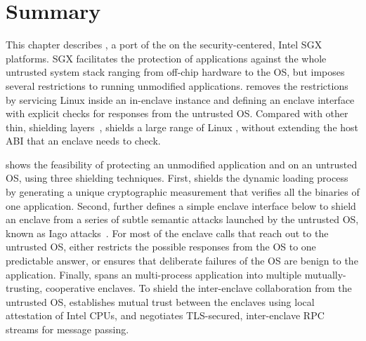 \section{Summary}

This chapter describes \graphenesgx{},
a port of the \graphene{} \libos{} on the security-centered, Intel SGX platforms.
SGX facilitates the protection of applications
against the whole untrusted system stack ranging from off-chip hardware to the OS,
but imposes several restrictions to running unmodified applications.
\graphenesgx{} removes the restrictions
by servicing Linux \linuxapis{} inside an in-enclave \libos{} instance and defining an enclave interface with explicit checks for responses from the untrusted OS.
Compared with other thin, shielding layers~\cite{osdi16scone,shinde17panoply}, \graphenesgx{} shields a large range of Linux \linuxapis{},
without extending the host ABI that an enclave needs to check.



\graphenesgx{} shows the feasibility
of protecting an unmodified application and \libos{} on an untrusted OS, using three shielding techniques.
First, \graphenesgx{}
shields the dynamic loading process
by generating a unique cryptographic measurement that verifies all the binaries of one application.
Second, \graphenesgx{} further defines a simple
enclave interface
below \thehostabi{} to shield an enclave from a series of subtle semantic attacks
launched by the untrusted OS, known as Iago attacks~\cite{checkoway13iago}.
For most of the enclave calls that reach out to the untrusted OS,
\graphenesgx{} either restricts the possible responses
from the OS to one predictable answer,
or ensures that deliberate failures of the OS are benign to the application.
Finally, \graphenesgx{} spans an multi-process application
into multiple mutually-trusting, cooperative enclaves.
To shield the inter-enclave collaboration from the untrusted OS,
\graphenesgx{} establishes mutual trust between the enclaves
using local attestation of Intel CPUs,
and negotiates TLS-secured, inter-enclave RPC streams for message passing.


